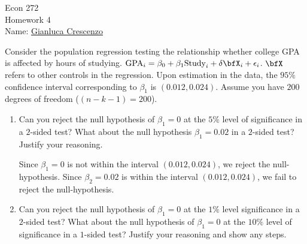 \documentclass[11pt,twoside,openany]{memoir}
\begin{document}
\begin{center}
{\large Econ 272 \\[0.1in]Homework 4 \\[0.1in]}
{Name:} {\underline{Gianluca Crescenzo\hspace*{2in}}}\\[0.15in]
\end{center}
\vspace{4pt}
    \begin{question}
        Consider the population regression testing the relationship whether college GPA is affected by hours of studying. $\text{GPA}_i = \beta_0 + \beta_1 \text{Study}_i + \delta \bfX_i + \epsilon_i$. $\bfX$ refers to other controls in the regression. Upon estimation in the data, the $95\%$ confidence interval corresponding to $\beta_1$ is $(0.012,0.024)$. Assume you have $200$ degrees of freedom ($(n-k-1)=200$).
            \begin{enumerate}[label = (\alph*),itemsep=1pt,topsep=3pt]
                \item Can you reject the null hypothesis of $\beta_1 = 0$ at the $5\%$ level of significance in a $2$-sided test? What about the null hypothesis $\beta_1 = 0.02$ in a $2$-sided test? Justify your reasoning.
                    {\color{blue} \begin{solution}
                        Since $\beta_1 = 0$ is not within the interval $(0.012,0.024)$, we reject the null-hypothesis. Since $\beta_2 = 0.02$ is within the interval $(0.012,0.024)$, we fail to reject the null-hypothesis.
                    \end{solution}}

                \item Can you reject the null hypothesis of $\beta_1 = 0$ at the $1\%$ level significance in a $2$-sided test? What about the null hypothesis of $\beta_1 = 0$ at the $10\%$ level of significance in a $1$-sided test? Justify your reasoning and show any steps.
                    {\color{blue} \begin{solution}
                    \end{solution}}
            \end{enumerate}
    \end{question}
\end{document}
